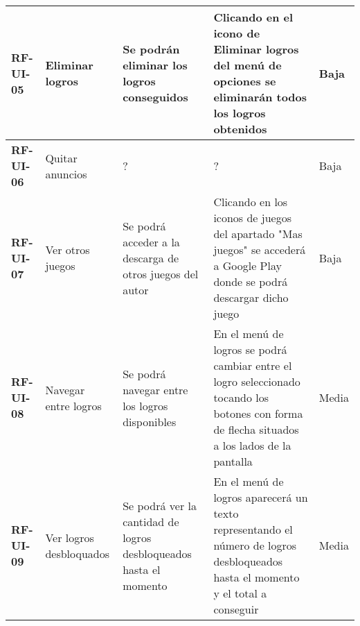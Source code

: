 \begin{table}[]
\begin{tabular}{lllll}
\multicolumn{1}{|l|}{\textbf{RF-UI-05}}      & \multicolumn{1}{l|}{Eliminar logros}               & \multicolumn{1}{l|}{Se podrán eliminar los logros conseguidos}                                         & \multicolumn{1}{l|}{Clicando en el icono de Eliminar logros del menú de opciones se eliminarán todos los logros obtenidos}                                                                                                                                            & \multicolumn{1}{l|}{Baja}               \\ \hline
\multicolumn{1}{|l|}{\textbf{RF-UI-06}}      & \multicolumn{1}{l|}{Quitar anuncios}               & \multicolumn{1}{l|}{?}                                                                                 & \multicolumn{1}{l|}{?}                                                                                                                                                                                                                                                & \multicolumn{1}{l|}{Baja}               \\ \hline
\multicolumn{1}{|l|}{\textbf{RF-UI-07}}      & \multicolumn{1}{l|}{Ver otros juegos}              & \multicolumn{1}{l|}{Se podrá acceder a la descarga de otros juegos del autor}                          & \multicolumn{1}{l|}{Clicando en los iconos de juegos del apartado "Mas juegos" se accederá a Google Play donde se podrá descargar dicho juego}                                                                                                                        & \multicolumn{1}{l|}{Baja}               \\ \hline
\multicolumn{1}{|l|}{\textbf{RF-UI-08}}      & \multicolumn{1}{l|}{Navegar entre logros}          & \multicolumn{1}{l|}{Se podrá navegar entre los logros disponibles}                                     & \multicolumn{1}{l|}{En el menú de logros se podrá cambiar entre el logro seleccionado tocando los botones con forma de flecha situados a los lados de la pantalla}                                                                                                    & \multicolumn{1}{l|}{Media}              \\ \hline
\multicolumn{1}{|l|}{\textbf{RF-UI-09}}      & \multicolumn{1}{l|}{Ver logros desbloquados}       & \multicolumn{1}{l|}{Se podrá ver la cantidad de logros desbloqueados hasta el momento}                 & \multicolumn{1}{l|}{En el menú de logros aparecerá un texto representando el número de logros desbloqueados hasta el momento y el total a conseguir}                                                                                                                  & \multicolumn{1}{l|}{Media}              \\ \hline

\end{tabular}
\end{table}
